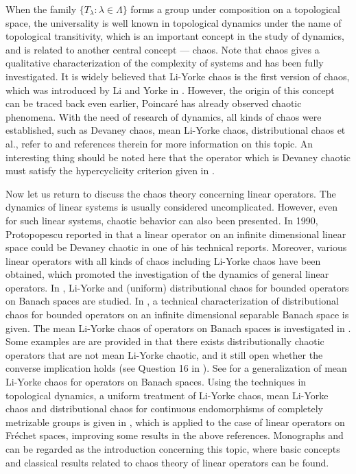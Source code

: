 \documentclass[12pt,a4paper]{amsart}
\theoremstyle{definition}
\theoremstyle{plain}
\begin{document}
When the family $\{T_\lambda\colon\lambda\in\Lambda\}$ forms a group under composition on a topological space, the universality is well known in topological dynamics under the name of topological transitivity, which is an important concept in the study of dynamics, and is related to another central concept --- chaos. 
Note that chaos gives a qualitative characterization of the complexity of systems and has been fully investigated. It is widely believed that Li-Yorke chaos is the first version of chaos, which was introduced by Li and Yorke in \cite{LY1975}.
However, the origin of this concept can be traced back even earlier, Poincar\'e has already observed chaotic phenomena.
With the need of research of dynamics, all kinds of chaos were established, such as Devaney chaos, mean Li-Yorke chaos, distributional chaos et al., refer to \cite{LY2016} and references therein for more information on this topic.
An interesting thing should be noted here that the operator which is Devaney chaotic must satisfy the hypercyclicity criterion given in \cite{BP1999}.

Now let us return to discuss the chaos theory concerning linear operators. The dynamics of linear systems is usually considered uncomplicated.
However, even for such linear systems, chaotic behavior can also been presented.
In 1990, Protopopescu reported in \cite{P1990} that a linear operator on an infinite dimensional linear space could be Devaney chaotic in one of his technical reports.
Moreover, various linear operators with all kinds of chaos including Li-Yorke chaos have been obtained, which promoted the investigation of the dynamics of general linear operators. 
In \cite{BBMP2011}, Li-Yorke and (uniform) distributional chaos for bounded operators on Banach spaces are studied. 
In \cite{BBMP2013}, a technical characterization of distributional chaos for bounded operators on an infinite dimensional separable Banach space is given. 
The mean Li-Yorke chaos of operators on Banach spaces is investigated in \cite{BBP2020}. Some examples are are provided in  \cite{BBP2020} that there exists distributionally chaotic operators that are not mean Li-Yorke chaotic, and it still open whether the converse implication holds (see Question 16 in \cite{BBP2020}).
See \cite{HSX2021} for a  generalization of mean Li-Yorke chaos for operators on Banach spaces. 
Using the techniques in topological dynamics, a uniform treatment of Li-Yorke chaos, mean Li-Yorke chaos and distributional chaos for continuous endomorphisms of completely metrizable groups is given in \cite{JL2022}, which is applied to the case of linear operators on Fr\'echet spaces, improving some results in the above references. 
Monographs \cite{BM2009} and \cite{GP2011} can be regarded as the introduction concerning this topic, where basic concepts and classical results related to chaos theory of linear operators can be found.
\end{document}

